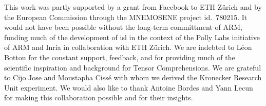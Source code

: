 \documentclass[format=acmsmall,review=false,screen=true]{acmart}
\begin{document}
\begin{acks}
  This work was partly supported by a grant from Facebook to ETH Zürich and by the European Commission through the MNEMOSENE project id.\ 780215. It would not have been possible without the long-term committment of ARM, funding much of the development of isl in the context of the Polly Labs initiative of ARM and Inria in collaboration with ETH Zürich.
  We are indebted to L\'eon Bottou for the constant support, feedback, and for providing much of the scientific inspiration and background for Tensor Comprehensions. We are grateful to Cijo Jose and Moustapha Ciss\'e with whom we derived the Kronecker Research Unit experiment. We would also like to thank Antoine Bordes and Yann Lecun for making this collaboration possible and for their insights.
\end{acks}

% 


\end{document}
